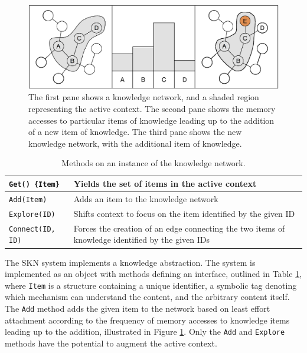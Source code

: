 \documentclass[11pt,letterpaper]{article}
\begin{document}
\begin{figure}[ht]
\centering
\includegraphics[scale=.5]{sf_add.eps}
\caption{The first pane shows a knowledge network, and a shaded region
  representing the active context. The second pane shows the memory accesses
  to particular items of knowledge leading up to the addition of a new item
  of knowledge. The third pane shows the new knowledge network, with the
  additional item of knowledge.}
\label{fig:sf_add}
\end{figure}

\begin{table}[h]
  \begin{center}
  \begin{tabular}{|l|p{4in}|}
    \hline
    {\tt Get() \{Item\}}  & Yields the set of items in the active context \\
                            \hline
    {\tt Add(Item)}       & Adds an item to the knowledge network \\ \hline
    {\tt Explore(ID)}     & Shifts context to focus on the item identified
                            by the given ID \\ \hline
    {\tt Connect(ID, ID)} & Forces the creation of an edge connecting the
                            two items of knowledge identified by the given
                            IDs \\
    \hline
  \end{tabular}
  \end{center}
\caption{Methods on an instance of the knowledge network.}
\label{tab:sf_get}
\end{table}


The SKN system implements a knowledge abstraction. The system is implemented
as an object with methods defining an interface, outlined in Table
\ref{tab:sf_get}, where {\tt Item} is a structure containing a unique
identifier, a symbolic tag denoting which mechanism can understand the
content, and the arbitrary content itself. The {\tt Add} method adds the given
item to the network based on least effort attachment according to the
frequency of memory accesses to knowledge items leading up to the addition,
illustrated in Figure \ref{fig:sf_add}. Only the {\tt Add} and {\tt Explore}
methods have the potential to augment the active context.
\end{document}
